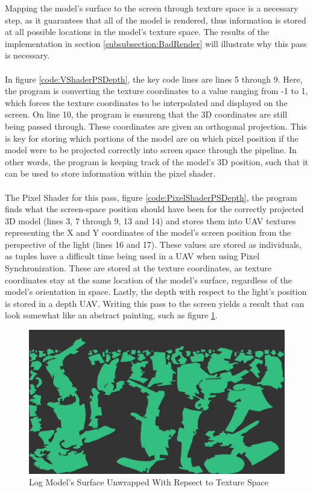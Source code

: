 \documentclass[a4paper, 12pt]{article}
\begin{document}
\noindent Mapping the model's surface to the screen through texture space is a
necessary step, as it guarantees that all of the model is rendered, thus
information is stored at all possible locations in the model's texture space.
The results of the implementation in section \ref{subsubsection:BadRender}
will illustrate why this pass is necessary. \\ \\ In figure
\ref{code:VShaderPSDepth}, the key code lines are lines 5 through 9. Here, the
program is converting the texture coordinates to a value ranging from -1 to 1,
which forces the texture coordinates to be interpolated and displayed on the
screen. On line 10, the program is ensureng that the 3D coordinates are still
being passed through. These coordinates are given an orthogonal projection.
This is key for storing which portions of the model are on which pixel
position if the model were to be projected correctly into screen space through
the pipeline. In other words, the program is keeping track of the model's 3D
position, such that it can be used to store information within the pixel
shader. \\ \\ The Pixel Shader for this pass, figure
\ref{code:PixelShaderPSDepth}, the program finds what the screen-space
position should have been for the correctly projected 3D model (lines 3, 7
through 9, 13 and 14) and stores them into UAV textures representing the X and
Y coordinates of the model's screen position from the perspective of the light
(lines 16 and 17). These values are stored as individuals, as tuples have a
difficult time being used in a UAV when using Pixel Synchronization. These are
stored at the texture coordinates, as texture coordinates stay at the same
location of the model's surface, regardless of the model's orientation in
space. Lastly, the depth with respect to the light's position is stored in a
depth UAV. Writing this pass to the screen yields a result that can look
somewhat like an abstract painting, such as figure \ref{pic:logTSpace}.

\begin{figure}[!htb]
	\centering
	\includegraphics[width=1.0\textwidth]{logTSpace.jpg}
	\caption{Log Model's Surface Unwrapped With Repsect to Texture Space}
	\label{pic:logTSpace}
\end{figure}
\end{document}
